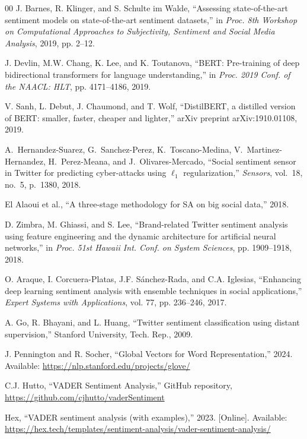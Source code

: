 \documentclass[conference]{IEEEtran}
\begin{document}
\begin{thebibliography}{00}
J. Barnes, R. Klinger, and S. Schulte im Walde, 
``Assessing state-of-the-art sentiment models on state-of-the-art sentiment datasets,'' 
in \textit{Proc. 8th Workshop on Computational Approaches to Subjectivity, Sentiment and Social Media Analysis}, 2019, pp. 2--12.

J. Devlin, M.W. Chang, K. Lee, and K. Toutanova, 
``BERT: Pre-training of deep bidirectional transformers for language understanding,'' 
in \textit{Proc. 2019 Conf. of the NAACL: HLT}, pp. 4171--4186, 2019.

V. Sanh, L. Debut, J. Chaumond, and T. Wolf, 
``DistilBERT, a distilled version of BERT: smaller, faster, cheaper and lighter,'' 
arXiv preprint arXiv:1910.01108, 2019.

A.~Hernandez-Suarez, G.~Sanchez-Perez, K.~Toscano-Medina, V.~Martinez-Hernandez, H.~Perez-Meana, and J.~Olivares-Mercado,  
``Social sentiment sensor in Twitter for predicting cyber-attacks using $\ell_1$ regularization,''  
\textit{Sensors}, vol.~18, no.~5, p.~1380, 2018.

El Alaoui et al., 
``A three-stage methodology for SA on big social data,'' 
2018.

D. Zimbra, M. Ghiassi, and S. Lee, 
``Brand-related Twitter sentiment analysis using feature engineering and the dynamic architecture for artificial neural networks,'' 
in \textit{Proc. 51st Hawaii Int. Conf. on System Sciences}, pp. 1909--1918, 2018.

O. Araque, I. Corcuera-Platas, J.F. Sánchez-Rada, and C.A. Iglesias, 
``Enhancing deep learning sentiment analysis with ensemble techniques in social applications,'' 
\textit{Expert Systems with Applications}, vol. 77, pp. 236--246, 2017.

A. Go, R. Bhayani, and L. Huang, 
``Twitter sentiment classification using distant supervision,'' 
Stanford University, Tech. Rep., 2009.

J. Pennington and R. Socher, 
``Global Vectors for Word Representation,'' 
2024. Available: \url{https://nlp.stanford.edu/projects/glove/}

C.J. Hutto, 
``VADER Sentiment Analysis,'' 
GitHub repository, \url{https://github.com/cjhutto/vaderSentiment}

Hex, 
``VADER sentiment analysis (with examples),'' 
2023. [Online]. Available: \url{https://hex.tech/templates/sentiment-analysis/vader-sentiment-analysis/}


\end{thebibliography}
\end{document}
